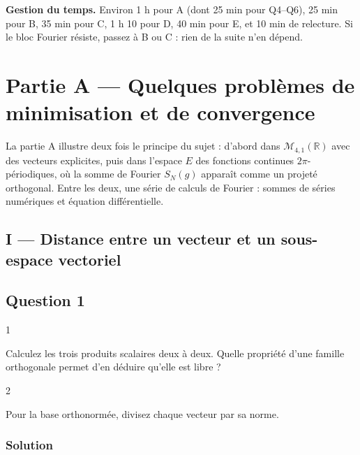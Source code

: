 \documentclass[11pt,a4paper]{article}
\begin{document}
\textbf{Gestion du temps.} Environ 1 h pour A (dont 25 min pour Q4--Q6), 25 min pour B, 35 min pour C, 1 h 10 pour D, 40 min pour E, et 10 min de relecture. Si le bloc Fourier résiste, passez à B ou C : rien de la suite n'en dépend.

\hypertarget{partie-a-quelques-probluxe8mes-de-minimisation-et-de-convergence}{%
\section{Partie A --- Quelques problèmes de minimisation et de convergence}\label{partie-a-quelques-probluxe8mes-de-minimisation-et-de-convergence}}

La partie A illustre deux fois le principe du sujet : d'abord dans \(\mathcal M_{4,1}(\mathbb R)\) avec des vecteurs explicites, puis dans l'espace \(E\) des fonctions continues \(2\pi\)-périodiques, où la somme de Fourier \(S_N(g)\) apparaît comme un projeté orthogonal. Entre les deux, une série de calculs de Fourier : sommes de séries numériques et équation différentielle.

\hypertarget{i-distance-entre-un-vecteur-et-un-sous-espace-vectoriel}{%
\subsection{I --- Distance entre un vecteur et un sous-espace vectoriel}\label{i-distance-entre-un-vecteur-et-un-sous-espace-vectoriel}}

\hypertarget{question-1}{%
\subsection{Question 1}\label{question-1}}

\begin{indication}{1}

Calculez les trois produits scalaires deux à deux. Quelle propriété d'une famille orthogonale permet d'en déduire qu'elle est libre ?

\end{indication}

\begin{indication}{2}

Pour la base orthonormée, divisez chaque vecteur par sa norme.

\end{indication}

\hypertarget{solution}{%
\subsubsection{Solution}\label{solution}}
\end{document}

